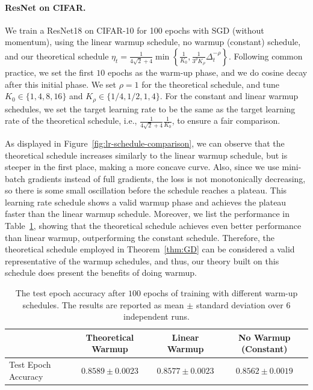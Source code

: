\documentclass{article}
\newcommand{\Kr}{K_{\rho}}
\begin{document}
\paragraph{ResNet on CIFAR.} We train a ResNet18 on CIFAR-10 for 100 epochs with SGD (without momentum), using the linear warmup schedule, no warmup (constant) schedule, and our theoretical schedule $\eta_t= \frac{1}{4\sqrt{2}+4}\min\left\{\frac{1}{K_0}, \frac{1}{3^\rho \Kr}\Delta_t^{-\rho}\right\}$. Following common practice, we set the first $10$ epochs as the warm-up phase, and we do cosine decay after this initial phase. We set $\rho=1$ for the theoretical schedule, and tune $K_0 \in\{1,4,8,16\}$ and $K_\rho \in\{1 / 4,1 / 2,1,4\}$. For the constant and linear warmup schedules, we set the target learning rate to be the same as the target learning rate of the theoretical schedule, i.e., $\frac{1}{4\sqrt{2}+4} \frac{1}{K_0}$, to ensure a fair comparison.

As displayed in Figure~\ref{fig:lr-schedule-comparison}, we can observe that the theoretical schedule increases similarly to the linear warmup schedule, but is steeper in the first place, making a more concave curve. Also, since we use mini-batch gradients instead of full gradients, the loss is not monotonically decreasing, so there is some small oscillation before the schedule reaches a plateau. This learning rate schedule shows a valid warmup phase and achieves the plateau faster than the linear warmup schedule.
Moreover, we list the performance in Table~\ref{tab:accuracy_results_resnet}, showing that the theoretical schedule achieves even better performance than linear warmup, outperforming the constant schedule. Therefore, the theoretical schedule employed in Theorem~\ref{thm:GD} can be considered a valid representative of the warmup schedules, and thus, our theory built on this schedule does present the benefits of doing warmup.

\begin{table}[h]
    \centering
    \begin{tabular}{lccc}
    \toprule
    & Theoretical Warmup & Linear Warmup & No Warmup (Constant) \\
    \midrule
    Test Epoch Accuracy & $0.8589 \pm 0.0023$ & $0.8577 \pm 0.0023$ & $0.8562 \pm 0.0019$ \\
    \bottomrule
    \end{tabular}
    \caption{The test epoch accuracy after $100$ epochs of training with different warm-up schedules. The results are reported as mean $\pm$ standard deviation over $6$ independent runs.}
    \label{tab:accuracy_results_resnet}
\end{table}
\end{document}
